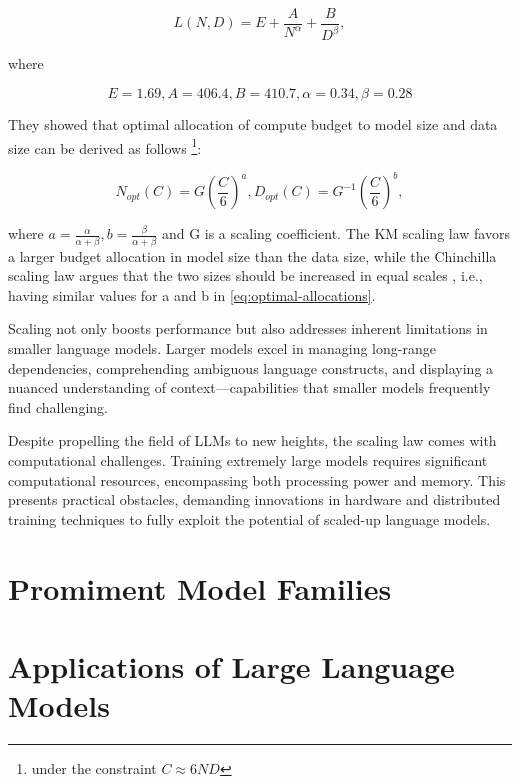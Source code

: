 {{        \[L(N,D) = E + \frac{A}{N^\alpha} + \frac{B}{D^\beta},\]

        where

        \[E=1.69, A=406.4,B = 410.7, \alpha = 0.34, \beta = 0.28\]

        They showed that optimal allocation of compute budget to model size and data size can be derived as follows \footnote{under the constraint \(C \approx 6ND\)}:

        \begin{center}
            \begin{equation}
                N_{opt}(C) = G(\frac{C}{6})^a, D_{opt}(C) = G^{-1}(\frac{C}{6})^b, \label{eq:optimal-allocations}
            \end{equation}
        \end{center}

        where \(a=\frac{\alpha}{\alpha+\beta}, b=\frac{\beta}{\alpha+\beta}\) and G is a scaling coefficient.
        The KM scaling law favors a larger budget allocation in model size than the data size, while the Chinchilla scaling law argues that the two sizes should be increased in equal scales \cite{scaling2}, i.e., having similar values for a and b in \eqref{eq:optimal-allocations}.

    }
}

Scaling not only boosts performance but also addresses inherent limitations in smaller language models.
Larger models excel in managing long-range dependencies, comprehending ambiguous language constructs, and displaying a nuanced understanding of context—capabilities that smaller models frequently find challenging.

Despite propelling the field of LLMs to new heights, the scaling law comes with computational challenges.
Training extremely large models requires significant computational resources, encompassing both processing power and memory.
This presents practical obstacles, demanding innovations in hardware and distributed training techniques to fully exploit the potential of scaled-up language models.


\section{Promiment Model Families}
\label{sec:promiment-model-families}


\section{Applications of Large Language Models}
\label{sec:applications-of-large-language-models}
